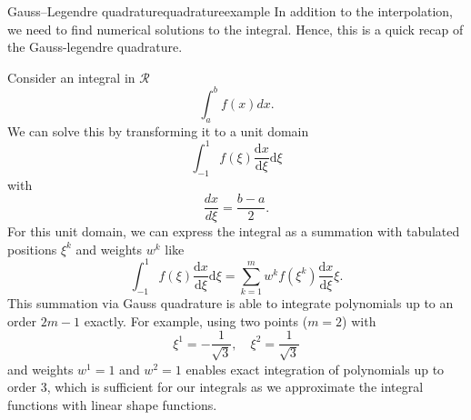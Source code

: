 \begin{example}{Gauss–Legendre quadrature}{quadratureexample} 
    In addition to the interpolation, we need to find numerical solutions to the integral. Hence, this is a quick recap of the Gauss-legendre quadrature. 
    
    Consider an integral in $\mathcal{R}$
    \begin{equation}
        \int_{a}^{b} f(x) dx.
    \end{equation}
    We can solve this by transforming it to a unit domain
    \begin{equation}
        \int_{-1}^{1} f(\xi) \frac{\text{d}x}{\text{d}\xi} \text{d}\xi
    \end{equation}
    with 
    \begin{equation}
        \frac{dx}{d\xi} = \frac{b-a}{2}.
    \end{equation}
    For this unit domain, we can express the integral as a summation with tabulated positions $\xi^k$ and weights $w^k$ like
    \begin{equation}
        \int_{-1}^{1} f(\xi) \frac{\text{d}x}{\text{d}\xi} \text{d}\xi
        = \sum_{k=1}^m w^k f(\xi^k) \frac{\text{d}x}{\text{d}\xi} \xi.
    \end{equation}
    This summation via Gauss quadrature is able to integrate polynomials up to an order $2m-1$ exactly. For example, using two points ($m=2$) with 
    \begin{equation}
        \xi^1 = -\frac{1}{\sqrt{3}}, \quad \xi^2 = \frac{1}{\sqrt{3}}
    \end{equation}
    and weights $w^1=1$ and $w^2=1$ enables exact integration of polynomials up to order 3, which is sufficient for our integrals as we approximate the integral functions with linear shape functions. 

    \begin{center}
        
    \end{center}
    

\end{example}
